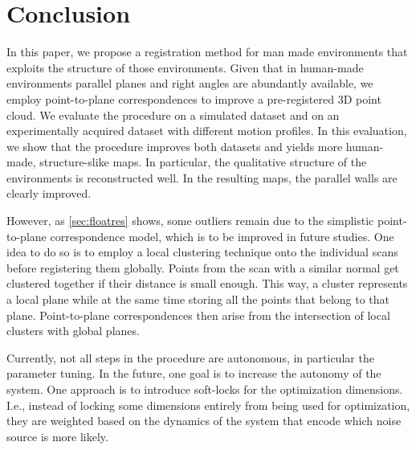\section{Conclusion}

In this paper, we propose a registration method for man made environments that exploits the structure of those environments. 
Given that in human-made environments parallel planes and right angles are abundantly available, we employ point-to-plane correspondences to improve a pre-registered 3D point cloud. 
We evaluate the procedure on a simulated dataset and on an experimentally acquired dataset with different motion profiles. 
In this evaluation, we show that the procedure improves both datasets and yields more human-made, structure-slike maps. 
In particular, the qualitative structure of the environments is reconstructed well. 
In the resulting maps, the parallel walls are clearly improved.

However, as \ref{sec:floatres} shows, some outliers remain due to the simplistic point-to-plane correspondence model, which is to be improved in future studies.
One idea to do so is to employ a local clustering technique onto the individual scans before registering them globally. 
Points from the scan with a similar normal get clustered together if their distance is small enough.
This way, a cluster represents a local plane while at the same time storing all the points that belong to that plane.
Point-to-plane correspondences then arise from the intersection of local clusters with global planes.

Currently, not all steps in the procedure are autonomous, in particular the parameter tuning. 
In the future, one goal is to increase the autonomy of the system.
One approach is to introduce soft-locks for the optimization dimensions.
I.e., instead of locking some dimensions entirely from being used for optimization, they are weighted based on the dynamics of the system that encode which noise source is more likely.  

